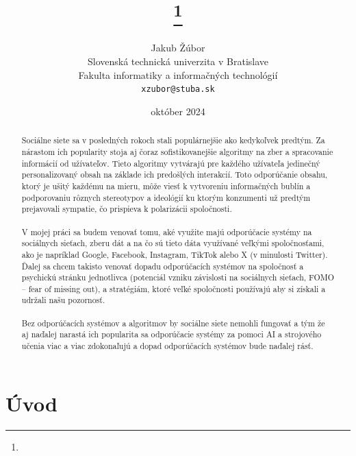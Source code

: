 \documentclass[10pt,twoside,slovak,a4paper]{article}
\title{\thanks{}} %
\author{Jakub Žúbor\\[2pt]
	{\small Slovenská technická univerzita v Bratislave}\\
	{\small Fakulta informatiky a informačných technológií}\\
	{\small \texttt{xzubor@stuba.sk}}
	}
\date{\small október 2024} %
\begin{document}

\maketitle

\begin{abstract}

Sociálne siete sa  v posledných rokoch stali populárnejšie ako kedykoľvek predtým. Za nárastom ich popularity stoja aj čoraz sofistikovanejšie algoritmy na zber a spracovanie informácií od užívateľov. Tieto algoritmy vytvárajú pre každého užívateľa jedinečný personalizovaný obsah na základe ich predošlých interakcií. Toto odporúčanie obsahu, ktorý je ušitý každému na mieru, môže viesť k vytvoreniu informačných bublín a podporovaniu rôznych stereotypov a ideológií ku ktorým konzumenti už predtým prejavovali sympatie, čo prispieva k polarizácii spoločnosti. \\
\\
V mojej práci sa budem venovať tomu, aké využite majú odporúčacie systémy na sociálnych sieťach, zberu dát a na čo sú tieto dáta využívané veľkými spoločnosťami, ako je napríklad Google, Facebook, Instagram, TikTok alebo X (v minulosti Twitter). Ďalej sa chcem takisto venovať dopadu odporúčacích systémov na spoločnosť a psychickú stránku jednotlivca (potenciál vzniku závislosti na sociálnych sieťach, FOMO – fear of missing out), a stratégiám, ktoré veľké spoločnosti používajú aby si získali a udržali našu pozornosť.\\
\\
Bez odporúčacích systémov a algoritmov by sociálne siete nemohli fungovať a tým že aj naďalej narastá ich popularita sa odporúčacie systémy za pomoci AI a strojového učenia viac a viac zdokonaľujú a dopad odporúčacích systémov bude naďalej rásť.

\end{abstract}



\section{Úvod}
\end{document}

